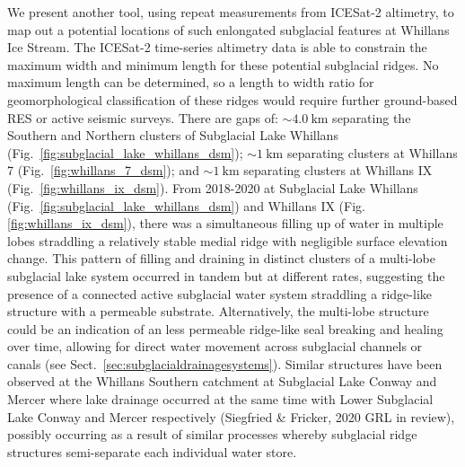 We present another tool, using repeat measurements from ICESat-2 altimetry, to map out a potential locations of such enlongated subglacial features at Whillans Ice Stream. %
The ICESat-2 time-series altimetry data is able to constrain the maximum width and minimum length for these potential subglacial ridges.
No maximum length can be determined, so a length to width ratio for geomorphological classification of these ridges would require further ground-based \gls{RES} or active seismic surveys.
There are gaps of: $\sim\SI{4.0}{\kilo\metre}$ separating the Southern and Northern clusters of Subglacial Lake Whillans (Fig.~\ref{fig:subglacial_lake_whillans_dsm}); $\sim\SI{1}{\kilo\metre}$ separating clusters at Whillans 7 (Fig.~\ref{fig:whillans_7_dsm}); and $\sim\SI{1}{\kilo\metre}$ separating clusters at Whillans IX (Fig.~\ref{fig:whillans_ix_dsm}).
From 2018-2020 at Subglacial Lake Whillans (Fig.~\ref{fig:subglacial_lake_whillans_dsm}) and Whillans IX (Fig. \ref{fig:whillans_ix_dsm}), there was a simultaneous filling up of water in multiple lobes straddling a relatively stable medial ridge with negligible surface elevation change.
This pattern of filling and draining in distinct clusters of a multi-lobe subglacial lake system occurred in tandem but at different rates, suggesting the presence of a connected active subglacial water system straddling a ridge-like structure with a permeable substrate.
Alternatively, the multi-lobe structure could be an indication of an less permeable ridge-like seal breaking and healing over time, allowing for direct water movement across subglacial channels or canals (see Sect.~\ref{sec:subglacialdrainagesystems}).
Similar structures have been observed at the Whillans Southern catchment at Subglacial Lake Conway and Mercer where lake drainage occurred at the same time with Lower Subglacial Lake Conway and Mercer respectively (Siegfried \& Fricker, 2020 GRL in review), possibly occurring as a result of similar processes whereby subglacial ridge structures semi-separate each individual water store. %



